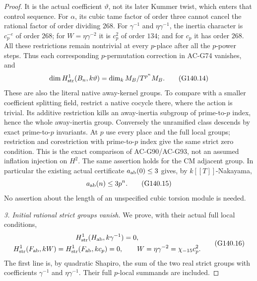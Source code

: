 \begin{proof}
It is the actual coefficient $\vartheta$, not its later Kummer
twist, which enters that control sequence.  For $\alpha$, its
cubic tame factor of order three cannot cancel the rational
factor of order dividing $268$.  For $\gamma^{-1}$ and
$\eta\gamma^{-1}$, the inertia character is $c_p^{-e}$ of
order $268$; for $W=\eta\gamma^{-2}$ it is $c_p^2$ of order
$134$; and for $c_p$ it has order $268$.
All these restrictions remain nontrivial at every $p$-place
after all the $p$-power steps.  Thus each corresponding
$p$-permutation correction in AC-G74 vanishes, and
\[
 \dim H^1_{\rm str}(B_n,k\vartheta)
                 =\dim_k M_B/T^{p^n}M_B.
 \tag{G140.14}
\]
These are also the literal native away-kernel groups.  To compare
with a smaller coefficient splitting field, restrict a native
cocycle there, where the action is trivial.  Its additive restriction
kills an away-inertia subgroup of prime-to-$p$ index, hence the whole
away-inertia group.  Conversely the unramified class descends by
exact prime-to-$p$ invariants.  At $p$ use every place and the full
local groups; restriction and corestriction with prime-to-$p$ index
give the same strict zero condition.  This is the exact comparison
of AC-G90/AC-G93, not an assumed inflation injection on $H^2$.
The same assertion holds for the CM adjacent group.
In particular the existing actual certificate $a_{\rm ab}(0)\le3$
gives, by $k[[T]]$-Nakayama,
\[
                         a_{\rm ab}(n)\le3p^n.
 \tag{G140.15}
\]
No assertion about the length of an unspecified cubic torsion
module is needed.

\emph{3. Initial rational strict groups vanish.}
We prove, with their actual full local conditions,
\[
 \begin{gathered}
 H^1_{\rm str}(H_{\rm ab},k\gamma^{-1})=0,\\
 H^1_{\rm str}(F_{\rm ab},kW)=
 H^1_{\rm str}(F_{\rm ab},kc_p)=0,
 \qquad W=\eta\gamma^{-2}=\chi_{-15}c_p^2.
 \end{gathered} \tag{G140.16}
\]
The first line is, by quadratic Shapiro, the sum of the two real
strict groups with coefficients $\gamma^{-1}$ and
$\eta\gamma^{-1}$.  Their full $p$-local summands are included.


\end{proof}
